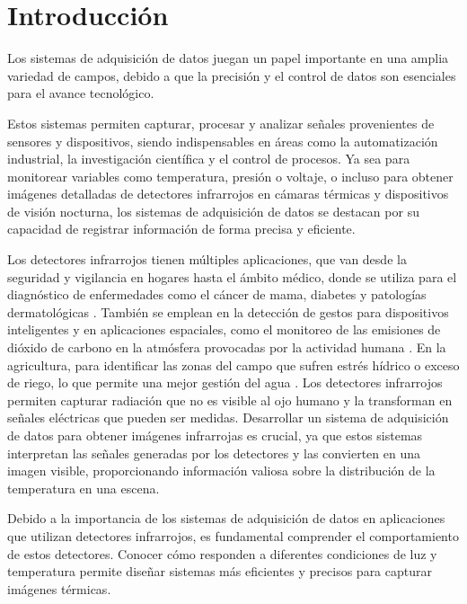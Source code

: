 \chapter{Introducción}
Los sistemas de adquisición de datos juegan un papel importante en una amplia variedad de campos, debido a que la precisión y el control de datos son esenciales para el avance tecnológico.

Estos sistemas permiten capturar, procesar y analizar señales provenientes de sensores y dispositivos, siendo indispensables en áreas como la automatización industrial, la investigación científica y el control de procesos. Ya sea para monitorear variables como temperatura, presión o voltaje, o incluso para obtener imágenes detalladas de detectores infrarrojos en cámaras térmicas y dispositivos de visión nocturna, los sistemas de adquisición de datos se destacan por su capacidad de registrar información de forma precisa y eficiente. 


Los detectores infrarrojos tienen múltiples aplicaciones, que van desde la seguridad y vigilancia en hogares \cite{Yii2023} hasta el ámbito médico, donde se utiliza para el diagnóstico de enfermedades como el cáncer de mama, diabetes \cite{LeneroBardallo2022} y patologías dermatológicas \cite{She2024}. También se emplean en la detección de gestos para dispositivos inteligentes \cite{LeBa2019} y en aplicaciones espaciales, como el monitoreo de las emisiones de dióxido de carbono en la atmósfera provocadas por la actividad humana \cite{Minoglou2019}. En la agricultura, para identificar las zonas del campo que sufren estrés hídrico o exceso de riego, lo que permite una mejor gestión del agua \cite{Parihar2021}. Los detectores infrarrojos permiten capturar radiación que no es visible al ojo humano y la transforman en señales eléctricas que pueden ser medidas. Desarrollar un sistema de adquisición de datos para obtener imágenes infrarrojas es crucial, ya que estos sistemas interpretan las señales generadas por los detectores y las convierten en una imagen visible, proporcionando información valiosa sobre la distribución de la temperatura en una escena.


Debido a la importancia de los sistemas de adquisición de datos en aplicaciones que utilizan detectores infrarrojos, es fundamental comprender el comportamiento de estos detectores. Conocer cómo responden a diferentes condiciones de luz y temperatura permite diseñar sistemas más eficientes y precisos para capturar imágenes térmicas.
    
